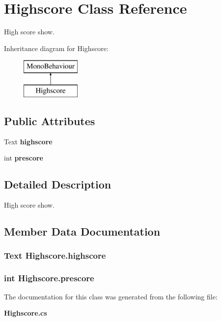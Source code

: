 \section{Highscore Class Reference}
\label{class_highscore}


High score show.  


Inheritance diagram for Highscore\+:\begin{figure}[H]
\begin{center}
\leavevmode
\includegraphics[height=2.000000cm]{class_highscore}
\end{center}
\end{figure}
\subsection*{Public Attributes}
\begin{DoxyCompactItemize}
\item 
Text {\bf highscore}
\item 
int {\bf prescore}
\end{DoxyCompactItemize}


\subsection{Detailed Description}
High score show. 



\subsection{Member Data Documentation}
\subsubsection[{highscore}]{\setlength{\rightskip}{0pt plus 5cm}Text Highscore.\+highscore}\label{class_highscore_a07807adadc0300fa766db08f061b9260}
\subsubsection[{prescore}]{\setlength{\rightskip}{0pt plus 5cm}int Highscore.\+prescore}\label{class_highscore_aa4e100b33e76014687ea7a183e9efc7b}


The documentation for this class was generated from the following file\+:\begin{DoxyCompactItemize}
\item 
{\bf Highscore.\+cs}\end{DoxyCompactItemize}
